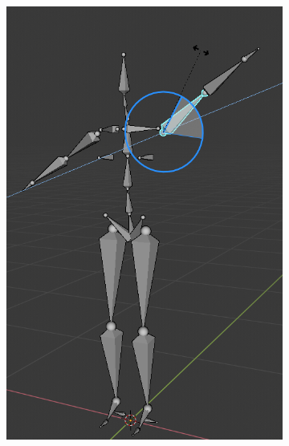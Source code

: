 \begin{figure}
\begin{subfigure}{.33\textwidth}
  \label{fig:FK1}
\end{subfigure}%
\begin{subfigure}{.33\textwidth}
  \centering
  \includegraphics[width=\linewidth]{Figures/armature2}
  \label{fig:FK2}
\end{subfigure}%
\begin{subfigure}{.33\textwidth}
  \centering

\end{subfigure}
\end{figure}

